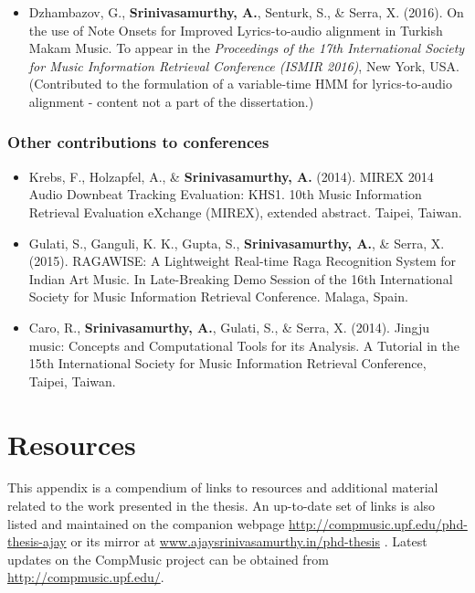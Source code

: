 \begin{itemize}[leftmargin=*]
	\item Dzhambazov, G., \textbf{Srinivasamurthy, A.}, Senturk, S., \& Serra, X. (2016). On the use of Note Onsets for Improved Lyrics-to-audio alignment in Turkish Makam Music. To appear in the \emph{Proceedings of the 17th International Society for Music Information Retrieval Conference (ISMIR 2016)}, New York, USA. {\footnotesize (Contributed to the formulation of a variable-time \gls{HMM} for lyrics-to-audio alignment -  content not a part of the dissertation.)}
\end{itemize}
%
\subsection*{Other contributions to conferences}
\begin{itemize}[leftmargin=*]
\item Krebs, F., Holzapfel, A., \& \textbf{Srinivasamurthy, A.} (2014). MIREX 2014 Audio Downbeat Tracking Evaluation: KHS1. 10th Music Information Retrieval Evaluation eXchange (MIREX), extended abstract. Taipei, Taiwan.  
\item Gulati, S., Ganguli, K. K., Gupta, S., \textbf{Srinivasamurthy, A.}, \& Serra, X. (2015). RAGAWISE: A Lightweight Real-time Raga Recognition System for Indian Art Music. In Late-Breaking Demo Session of the 16th International Society for Music Information Retrieval Conference. Malaga, Spain. 
\item Caro, R., \textbf{Srinivasamurthy, A.}, Gulati, S., \& Serra, X. (2014). Jingju music: Concepts and Computational Tools for its Analysis. A Tutorial in the 15th International Society for Music Information Retrieval Conference, Taipei, Taiwan. 
\end{itemize}
%
%
\chapter{Resources}\label{app:resources}
This appendix is a compendium of links to resources and additional material related to the work presented in the thesis. An up-to-date set of links is also listed and maintained on the companion webpage \url{http://compmusic.upf.edu/phd-thesis-ajay} or its mirror at \url{www.ajaysrinivasamurthy.in/phd-thesis} . Latest updates on the CompMusic project can be obtained from \url{http://compmusic.upf.edu/}. 

